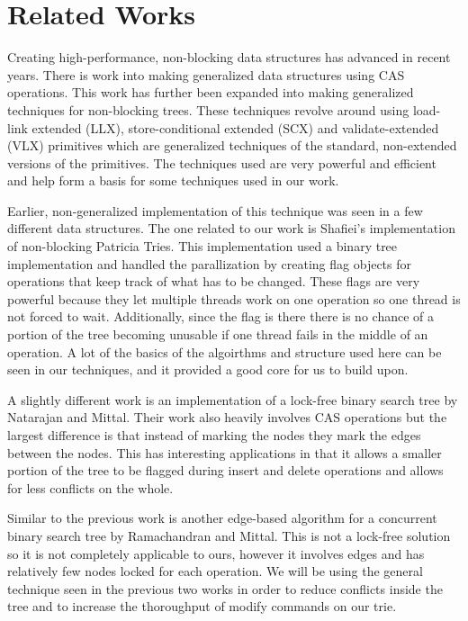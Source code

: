 \documentclass[conference]{IEEEtran}
\begin{document}
\section{Related Works}
Creating high-performance, non-blocking data structures has advanced in recent years. There is work into making generalized data structures using CAS operations. \cite{Brown2013} This work has further been expanded into making generalized techniques for non-blocking trees. \cite{Brown2014} These techniques revolve around using load-link extended (LLX), store-conditional extended (SCX) and validate-extended (VLX) primitives which are generalized techniques of the standard, non-extended versions of the primitives. \cite{Brown2013, Brown2014} The techniques used are very powerful and efficient and help form a basis for some techniques used in our work.
\par
Earlier, non-generalized implementation of this technique was seen in a few different data structures. The one related to our work is Shafiei's implementation of non-blocking Patricia Tries. \cite{Shafiei2013} This implementation used a binary tree implementation and handled the parallization by creating flag objects for operations that keep track of what has to be changed. These flags are very powerful because they let multiple threads work on one operation so one thread is not forced to wait. Additionally, since the flag is there there is no chance of a portion of the tree becoming unusable if one thread fails in the middle of an operation. \cite{Shafiei2013, Howley2012} A lot of the basics of the algoirthms and structure used here can be seen in our techniques, and it provided a good core for us to build upon. 
\par
A slightly different work is an implementation of a lock-free binary search tree by Natarajan and Mittal. Their work also heavily involves CAS operations but the largest difference is that instead of marking the nodes they mark the edges between the nodes.\cite{Natarajan2014} This has interesting applications in that it allows a smaller portion of the tree to be flagged during insert and delete operations and allows for less conflicts on the whole.
\par
Similar to the previous work is another edge-based algorithm for a concurrent binary search tree by Ramachandran and Mittal. This is not a lock-free solution so it is not completely applicable to ours, however it involves edges and has relatively few nodes locked for each operation. \cite{Ramachandran2015} We will be using the general technique seen in the previous two works in order to reduce conflicts  inside the tree and to increase the thoroughput of modify commands on our trie.
\end{document}
